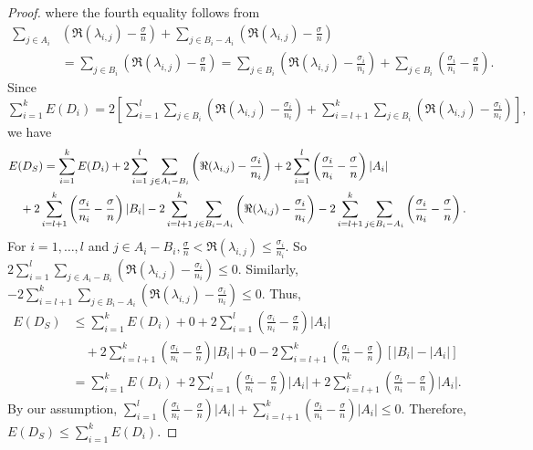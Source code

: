 \documentclass[12pt,a4paper,reqno]{amsart}
\numberwithin{equation}{section}
\theoremstyle{plain}
\theoremstyle{definition}
\newcommand{\<}{\langle}
\renewcommand{\>}{\rangle}
\begin{document}
\begin{proof}
	where the fourth equality follows from
	\begin{align*}
	\sum_{j\in A_i} &\left( \Re(\lambda_{i,j})-\frac{\sigma}{n} \right) 
	+\sum_{j\in B_i-A_i} \left( \Re(\lambda_{i,j})-\frac{\sigma}{n} \right) \\
	&= \sum_{j\in B_i} \left( \Re(\lambda_{i,j})-\frac{\sigma}{n} \right) 
	=\sum_{j\in B_i} \left( \Re(\lambda_{i,j})-\frac{\sigma_i}{n_i} \right) + \sum_{j\in B_i} \left( \frac{\sigma_i}{n_i}-\frac{\sigma}{n} \right).
	\end{align*}
	Since $\sum_{i=1}^k E(D_i)= 2 \left[\sum_{i=1}^l  \sum_{j\in B_i} \left( \Re(\lambda_{i,j}) -\frac{\sigma_i}{n_i}\right) +  \sum_{i=l+1}^k  \sum_{j\in B_i} \left( \Re(\lambda_{i,j})-\frac{\sigma_i}{n_i} \right) \right],$ we have
	\begin{align*}
	E(D_S) 
	&= \sum_{i=1}^k E(D_i) + 2\sum_{i=1}^l  \sum_{j\in A_i-B_i} \left( \Re(\lambda_{i,j}) -\frac{\sigma_i}{n_i} \right) + 2\sum_{i=1}^l \left( \frac{\sigma_i}{n_i}-\frac{\sigma}{n} \right) |A_i| \\
	&\hspace{-2em} + 2\sum_{i=l+1}^k \left( \frac{\sigma_i}{n_i}-\frac{\sigma}{n} \right) |B_i| - 2\sum_{i=l+1}^k \sum_{j\in B_i-A_i} \left( \Re(\lambda_{i,j}) -\frac{\sigma_i}{n_i}\right) - 2\sum_{i=l+1}^k \sum_{j\in B_i-A_i} \left( \frac{\sigma_i}{n_i}-\frac{\sigma}{n}\right).
	\end{align*}	
	For $i=1,\ldots,l$ and $j\in A_i-B_i, \frac{\sigma}{n}< \Re(\lambda_{i,j}) \leq \frac{\sigma_i}{n_i}$. So $2\sum_{i=1}^l  \sum_{j\in A_i-B_i} \left( \Re(\lambda_{i,j}) -\frac{\sigma_i}{n_i} \right) \leq 0$. Similarly, $-2\sum_{i=l+1}^k \sum_{j\in B_i-A_i} \left( \Re(\lambda_{i,j}) -\frac{\sigma_i}{n_i}\right) \leq 0$. Thus,   
	\begin{align*}
	E(D_S)
	&\leq \sum_{i=1}^k E(D_i)+0 + 2\sum_{i=1}^l \left( \frac{\sigma_i}{n_i}-\frac{\sigma}{n} \right) |A_i|\\
	&\quad + 2\sum_{i=l+1}^k \left( \frac{\sigma_i}{n_i}-\frac{\sigma}{n} \right) |B_i|+0 - 2\sum_{i=l+1}^k \left( \frac{\sigma_i}{n_i}-\frac{\sigma}{n} \right) [|B_i|-|A_i|]\\
	&=\sum_{i=1}^k E(D_i) + 2\sum_{i=1}^l \left( \frac{\sigma_i}{n_i}-\frac{\sigma}{n} \right)|A_i|+ 2\sum_{i=l+1}^k \left( \frac{\sigma_i}{n_i}-\frac{\sigma}{n} \right) |A_i|.
	\end{align*}
	By our assumption, $\sum_{i=1}^l \left( \frac{\sigma_i}{n_i}-\frac{\sigma}{n} \right)|A_i|+ \sum_{i=l+1}^k \left( \frac{\sigma_i}{n_i}-\frac{\sigma}{n} \right) |A_i|\leq 0$. Therefore, $E(D_S) \leq \sum_{i=1}^k E(D_i)$.
\end{proof}
\end{document}
